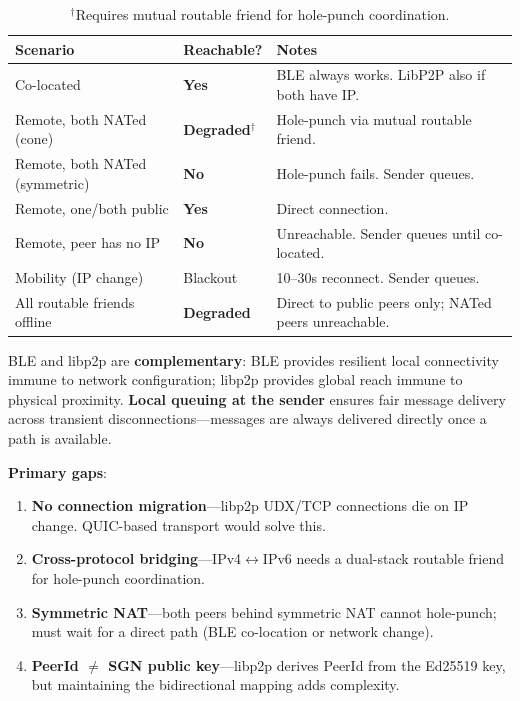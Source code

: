 \documentclass[11pt,a4paper]{article}
\newcommand{\yes}{\textcolor{yes}{\textbf{Yes}}}
\newcommand{\no}{\textcolor{no}{\textbf{No}}}
\newcommand{\dgr}{\textcolor{degraded}{\textbf{Degraded}}}
\begin{document}
\begin{table}[H]
\centering\small
\begin{tabular}{L{4.5cm} C{2cm} L{5cm}}
\toprule
\textbf{Scenario} & \textbf{Reachable?} & \textbf{Notes} \\
\midrule
Co-located & \yes & BLE always works. LibP2P also if both have IP. \\
Remote, both NATed (cone) & \dgr$^\dagger$ & Hole-punch via mutual routable friend. \\
Remote, both NATed (symmetric) & \no & Hole-punch fails. Sender queues. \\
Remote, one/both public & \yes & Direct connection. \\
Remote, peer has no IP & \no & Unreachable. Sender queues until co-located. \\
Mobility (IP change) & Blackout & 10--30s reconnect. Sender queues. \\
All routable friends offline & \dgr & Direct to public peers only; NATed peers unreachable. \\
\bottomrule
\end{tabular}
\caption*{\small $^\dagger$Requires mutual routable friend for hole-punch coordination.}
\end{table}

BLE and libp2p are \textbf{complementary}: BLE provides resilient local connectivity immune to network configuration; libp2p provides global reach immune to physical proximity. \textbf{Local queuing at the sender} ensures fair message delivery across transient disconnections---messages are always delivered directly once a path is available.

\textbf{Primary gaps}:
\begin{enumerate}[nosep]
  \item \textbf{No connection migration}---libp2p UDX/TCP connections die on IP change. QUIC-based transport would solve this.
  \item \textbf{Cross-protocol bridging}---IPv4$\leftrightarrow$IPv6 needs a dual-stack routable friend for hole-punch coordination.
  \item \textbf{Symmetric NAT}---both peers behind symmetric NAT cannot hole-punch; must wait for a direct path (BLE co-location or network change).
  \item \textbf{PeerId $\neq$ SGN public key}---libp2p derives PeerId from the Ed25519 key, but maintaining the bidirectional mapping adds complexity.
\end{enumerate}
\end{document}
